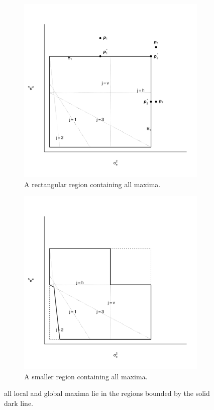 \documentclass{report}
\begin{document}
\begin{figure}[h]
  \begin{subfigure}{.5\textwidth}
	\centering
	\includegraphics[width=.8\linewidth]{figs/boundingbox.pdf}
	\caption{A rectangular region containing all maxima.}
	\label{fig:bigboundingbox}
  \end{subfigure}
  \begin{subfigure}{.5\textwidth}
	\centering
	\includegraphics[width=.8\linewidth]{figs/smallboundingregion.pdf}
	\caption{A smaller region containing all maxima.}
	\label{fig:smallboundingbox}
  \end{subfigure}
  \caption{all local and global maxima lie in the regions bounded by the solid
                dark line.
               }
  \label{fig:boundingbox}
\end{figure}
\end{document}
